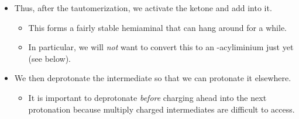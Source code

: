 \documentclass[../notes.tex]{subfiles}
\begin{document}
\begin{itemize}
\begin{itemize}
\begin{enumerate}
\begin{itemize}
            \end{itemize}
            \item The amide oxygen.
            \begin{itemize}
                \item Recall that the $\pKa$ of a protonated amide is $0$.
                \item This is because the positive charge we create is resonance-stabilized by the $\alpha$-nitrogen.
            \end{itemize}
        \end{enumerate}
        \item Thus, while protonating the ketone would seem like a logical first step to accelerate nucleophilic addition, he $\pKa$ values tell us that it is \emph{over a million times} more likely that we will protonate the amide first.
        \item Moreover, this protonation actually is helpful!
        \begin{itemize}
            \item Specifically, it can help tautomerize the amide into an \textbf{imidic acid}.
            \item The imidic acid's nitrogen will then have an unconjugated lone pair in an $sp^2$ orbital that is ideally positioned to attack the ketone once we protonate it. This imidic acid/\textbf{imidate}\footnote{Clear up the naming!} nitrogen is a superb nucleophile.
        \end{itemize}
    \end{itemize}
    \item Thus, after the tautomerization, we activate the ketone and add into it.
    \begin{itemize}
        \item This forms a fairly stable hemiaminal that can hang around for a while.
        \item In particular, we will \emph{not} want to convert this to an -acyliminium just yet (see below).
    \end{itemize}
    \item We then deprotonate the intermediate so that we can protonate it elsewhere.
    \begin{itemize}
        \item It is important to deprotonate \emph{before} charging ahead into the next protonation because multiply charged intermediates are difficult to access.
    \end{itemize}

\end{itemize}
\end{document}
